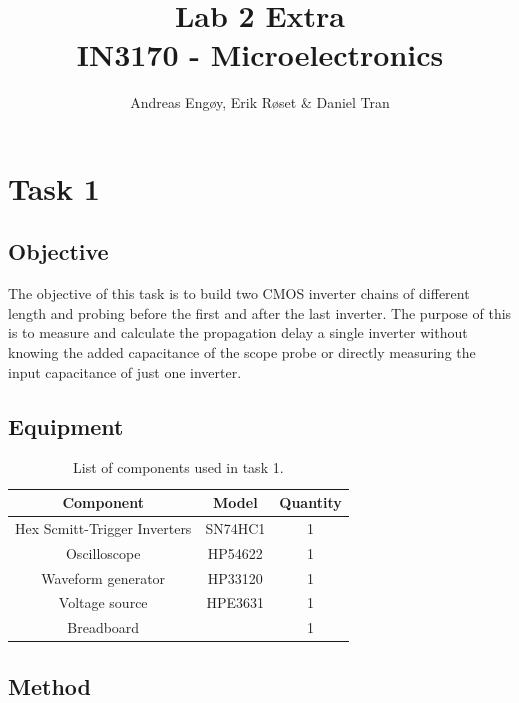 \documentclass[onecolumn]{article}
\title{Lab 2 Extra \\ \Large{IN3170 - Microelectronics}}
\author{Andreas Engøy, Erik Røset \& Daniel Tran}
\date{\monthname[\the\month] \the\year}
\begin{document}
\maketitle
\vspace*{50mm}
\tableofcontents

\section{Task 1}

\subsection{Objective}
The objective of this task is to build two CMOS inverter chains of different length and probing before the first and after the last inverter. The purpose of this is to measure and calculate the propagation delay a single inverter without knowing the added capacitance of the scope probe or directly measuring the input capacitance of just one inverter.

\subsection{Equipment}

\begin{table}[h]
    \centering
    \begin{tabular}{|c|c|c|}
        \hline
        \textbf{Component} & \textbf{Model} & \textbf{Quantity} \\
        \hline
        Hex Scmitt-Trigger Inverters & SN74HC1 & 1 \\
        Oscilloscope & HP54622 & 1 \\
        Waveform generator  & HP33120 & 1\\
        Voltage source & HPE3631 & 1 \\
        Breadboard & ~ & 1 \\
        \hline
    \end{tabular}
    \caption{List of components used in task 1.}
    \label{tab:bom}
\end{table}

\clearpage

\subsection{Method}
\end{document}
